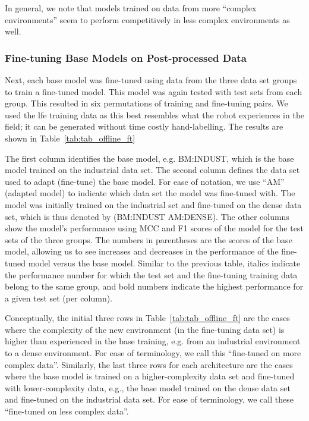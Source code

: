 In general, we note that models trained on data from more ``complex environments'' seem to perform competitively in less complex environments as well. 

\subsubsection{Fine-tuning Base Models on Post-processed Data}
Next, each base model was fine-tuned using data from the three data set groups to train a fine-tuned model. This model was again tested with test sets from each group. This resulted in six permutations of training and fine-tuning pairs. We used the \ac{lfe} training data as this best resembles what the robot experiences in the field; it can be generated without time costly hand-labelling. The results are shown in Table~\ref{tab:tab_offline_ft}

The first column identifies the base model, e.g. BM:INDUST, which is the base model trained on the industrial data set. The second column defines the data set used to adapt (fine-tune) the base model. For ease of notation, we use ``AM'' (adapted model) to indicate which data set the model was fine-tuned with. The model was initially trained on the industrial set and fine-tuned on the dense data set, which is thus denoted by (BM:INDUST AM:DENSE). The other columns show the model's performance using MCC and F1 scores of the model for the test sets of the three groups. The numbers in parentheses are the scores of the base model, allowing us to see increases and decreases in the performance of the fine-tuned model versus the base model. Similar to the previous table, italics indicate the performance number for which the test set and the fine-tuning training data belong to the same group, and bold numbers indicate the highest performance for a given test set (per column).

Conceptually, the initial three rows in Table~\ref{tab:tab_offline_ft} are the cases where the complexity of the new environment (in the fine-tuning data set) is higher than experienced in the base training, e.g. from an industrial environment to a dense environment. For ease of terminology, we call this ``fine-tuned on more complex data''. 
%
Similarly, the last three rows for each architecture are the cases where the base model is trained on a higher-complexity data set and fine-tuned with lower-complexity data, e.g., the base model trained on the dense data set and fine-tuned on the industrial data set. For ease of terminology, we call these ``fine-tuned on less complex data''. 

